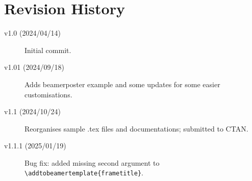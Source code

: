 \documentclass{article}
\begin{document}
\section{Revision History}
\begin{description}
\item[v1.0 (2024/04/14)] Initial commit.
\item[v1.01 (2024/09/18)] Adds beamerposter example and some updates for some easier customisations.
\item[v1.1 (2024/10/24)] Reorganises sample .tex files and documentations; submitted to CTAN.
\item[v1.1.1 (2025/01/19)] Bug fix: added missing second argument to \verb|\addtobeamertemplate{frametitle}|.
\end{description}
\end{document}
